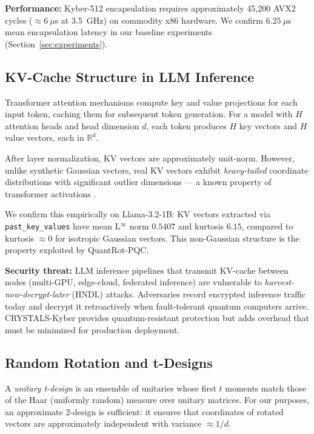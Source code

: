 \documentclass[preprint,a4paper]{article}
\begin{document}
\textbf{Performance:} Kyber-512 encapsulation requires
approximately 45,200 AVX2 cycles ($\approx 6~\mu$s at
3.5~GHz) on commodity x86 hardware. We confirm
$6.25~\mu$s mean encapsulation latency in our baseline
experiments (Section~\ref{sec:experiments}).

\subsection{KV-Cache Structure in LLM Inference}
\label{sec:kvcache}

Transformer attention mechanisms compute key and value
projections for each input token, caching them for
subsequent token generation. For a model with $H$
attention heads and head dimension $d$, each token
produces $H$ key vectors and $H$ value vectors, each
in $\mathbb{R}^d$.

After layer normalization, KV vectors are approximately
unit-norm. However, unlike synthetic Gaussian vectors,
real KV vectors exhibit \emph{heavy-tailed} coordinate
distributions with significant outlier dimensions --- a
known property of transformer activations
\cite{turboquant2025}.

We confirm this empirically on Llama-3.2-1B: KV vectors
extracted via \texttt{past\_key\_values} have mean
L$^\infty$ norm $0.5407$ and kurtosis $6.15$, compared
to kurtosis $\approx 0$ for isotropic Gaussian vectors.
This non-Gaussian structure is the property exploited
by QuantRot-PQC.

\textbf{Security threat:} LLM inference pipelines that
transmit KV-cache between nodes (multi-GPU, edge-cloud,
federated inference) are vulnerable to
\emph{harvest-now-decrypt-later} (HNDL) attacks.
Adversaries record encrypted inference traffic today
and decrypt it retroactively when fault-tolerant quantum
computers arrive. CRYSTALS-Kyber provides quantum-resistant
protection but adds overhead that must be minimized for
production deployment.

\subsection{Random Rotation and t-Designs}
\label{sec:tdesigns}

A \emph{unitary t-design} is an ensemble of unitaries
whose first $t$ moments match those of the Haar
(uniformly random) measure over unitary matrices.
For our purposes, an approximate 2-design is sufficient:
it ensures that coordinates of rotated vectors are
approximately independent with variance $\approx 1/d$.
\end{document}

